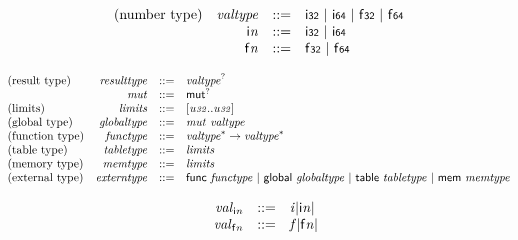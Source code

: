 \vspace{1ex}

$$
\begin{array}{@{}lrrl@{}l@{}}
\mbox{(number type)} & {\mathit{valtype}} &::=& \mathsf{i{\scriptstyle32}} ~|~ \mathsf{i{\scriptstyle64}} ~|~ \mathsf{f{\scriptstyle32}} ~|~ \mathsf{f{\scriptstyle64}} \\
& {\mathsf{i}}{{\mathit{n}}} &::=& \mathsf{i{\scriptstyle32}} ~|~ \mathsf{i{\scriptstyle64}} \\
& {\mathsf{f}}{{\mathit{n}}} &::=& \mathsf{f{\scriptstyle32}} ~|~ \mathsf{f{\scriptstyle64}} \\
\end{array}
$$

$$
\begin{array}{@{}lrrl@{}l@{}}
\mbox{(result type)} & {\mathit{resulttype}} &::=& {{\mathit{valtype}}^?} \\
& {\mathit{mut}} &::=& {\mathsf{mut}^?} \\
\mbox{(limits)} & {\mathit{limits}} &::=& {}[{\mathit{u{\scriptstyle32}}} .. {\mathit{u{\scriptstyle32}}}] \\
\mbox{(global type)} & {\mathit{globaltype}} &::=& {\mathit{mut}}~{\mathit{valtype}} \\
\mbox{(function type)} & {\mathit{functype}} &::=& {{\mathit{valtype}}^\ast} \rightarrow {{\mathit{valtype}}^\ast} \\
\mbox{(table type)} & {\mathit{tabletype}} &::=& {\mathit{limits}} \\
\mbox{(memory type)} & {\mathit{memtype}} &::=& {\mathit{limits}} \\
\mbox{(external type)} & {\mathit{externtype}} &::=& \mathsf{func}~{\mathit{functype}} ~|~ \mathsf{global}~{\mathit{globaltype}} ~|~ \mathsf{table}~{\mathit{tabletype}} ~|~ \mathsf{mem}~{\mathit{memtype}} \\
\end{array}
$$

\vspace{1ex}

$$
\begin{array}{@{}lrrl@{}l@{}}
& {{\mathit{val}}}_{{\mathsf{i}}{{\mathit{n}}}} &::=& {{\mathit{i}}}{{|{\mathsf{i}}{{\mathit{n}}}|}} \\
& {{\mathit{val}}}_{{\mathsf{f}}{{\mathit{n}}}} &::=& {{\mathit{f}}}{{|{\mathsf{f}}{{\mathit{n}}}|}} \\
\end{array}
$$

\vspace{1ex}

